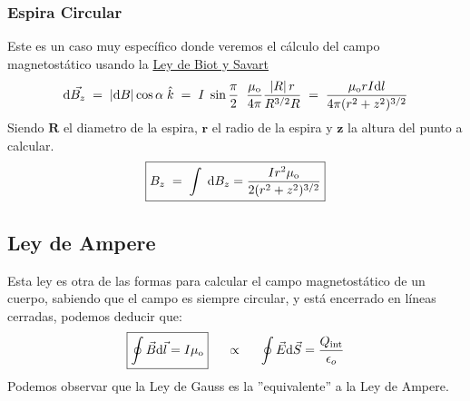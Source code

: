 \subsubsection{Espira Circular}
\begin{wrapfigure}{r}{4cm}
\end{wrapfigure}
 Este es un caso muy específico donde veremos el cálculo del campo magnetostático usando la \underline{Ley de Biot y Savart}
\[
        \mathrm{d}\vec{B_z}\hspace{1mm}=\hspace{1mm}\left | \mathrm{d}B \right |\cos{\alpha}\hspace{1mm}\hat{k} \hspace{1mm}=\hspace{1mm} I\hspace{1mm}\sin{\frac{\pi}{2}}\hspace{2mm}\frac{\mu_{\textnormal{o}}}{4\pi} \frac{\left | R \right  |r}{R^{3/2}R}\hspace{1mm}=\hspace{1mm}\frac{\mu_{\textnormal{o}}rI\mathrm{d}l}{4\pi(r^2+z^2)^{3/2}}
\]
 Siendo \(\mathbf{R}\) el diametro de la espira, \(\mathbf{r}\) el radio de la espira y \(\mathbf{z}\) la altura del punto a calcular.
\[
        \boxed{B_z \hspace{1mm} = \hspace{1mm}\int \hspace{1mm} \mathrm{d}B_z = \frac{Ir^2\mu_{\textnormal{o}}}{2(r^2+z^2)^{3/2}}}
\]
\subsection{Ley de Ampere}
 Esta ley es otra de las formas para calcular el campo magnetostático de un cuerpo, sabiendo que el campo es siempre circular, y está encerrado en líneas cerradas, podemos deducir que:
\[
        \boxed{\oint \vec{B}\mathrm{d}\vec{l} = I\mu_{\textnormal{o}}} \hspace{.5cm} \propto \hspace{.5cm} \oint \vec{E}\mathrm{d}\vec{S} = \frac{Q_\textnormal{int}}{\epsilon_o}
\]
 Podemos observar que la Ley de Gauss es la ''equivalente'' a la Ley de Ampere.
